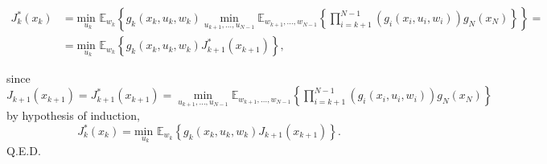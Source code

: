 \documentclass[11pt, english]{article}
\begin{document}
\begin{align*}
	J_k^*(x_k) & =\underset{u_k}{\text{min }}\mathbb{E}_{w_k}\left\{g_k(x_k,u_k,w_k)\underset{u_{k+1},\dots,u_{N-1}}{\min}\mathbb{E}_{w_{k+1},\dots,w_{N-1}}\left\{\prod\limits_{i=k+1}^{N-1}\left(g_i(x_i,u_i,w_i)\right)g_N(x_N)\right\} \right\}=\\
	& =\underset{u_k}{\text{min }}\mathbb{E}_{w_k}\left\{g_k(x_k,u_k,w_k)J_{k+1}^*(x_{k+1})\right\},
\end{align*}
 
since $J_{k+1}(x_{k+1})=J_{k+1}^*(x_{k+1})=\underset{u_{k+1},\dots,u_{N-1}}{\min}\mathbb{E}_{w_{k+1},\dots,w_{N-1}}\left\{\prod\limits_{i=k+1}^{N-1}\left(g_i(x_i,u_i,w_i)\right)g_N(x_N)\right\}$ by hypothesis of induction,
$$J_k^*(x_k)=\underset{u_k}{\text{min }}\mathbb{E}_{w_k}\left\{g_k(x_k,u_k,w_k)J_{k+1}(x_{k+1})\right\}.$$
Q.E.D.
\end{document}
